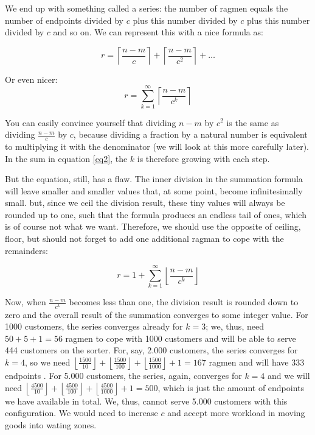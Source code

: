 \documentclass{scrreprt}
\begin{document}
We end up with something called a series:
the number of ragmen equals
the number of endpoints divided by $c$ 
plus this number divided by $c$ 
plus this number divided by $c$ 
and so on. We can represent this with a nice formula as:

\begin{equation}
r = \left\lceil\frac{n - m}{c}\right\rceil 
  + \left\lceil\frac{n - m}{c^2}\right\rceil 
  + \dots
\end{equation}

Or even nicer:
\begin{equation}\label{eq2}
r = \sum_{k=1}^{\infty}\left\lceil\frac{n - m}{c^k}\right\rceil 
\end{equation}

You can easily convince yourself
that dividing $n - m$ by $c^2$ is the same
as dividing $\frac{n - m}{c}$ by $c$,
because dividing a fraction by a natural number
is equivalent to multiplying it with the denominator
(we will look at this more carefully later).
In the sum in equation \ref{eq2},
the $k$ is therefore growing with each step.

But the equation, still, has a flaw.
The inner division in the summation formula
will leave smaller and smaller values
that, at some point, become infinitesimally small.
but, since we ceil the division result,
these tiny values will always be rounded up
to one, such that the formula produces
an endless tail of ones,
which is of course not what we want.
Therefore, we should use the opposite of ceiling,
floor, but should not forget to add one additional
ragman to cope with the remainders:

\begin{equation}\label{eq3}
r = 1 + \sum_{k=1}^{\infty}{\left\lfloor\frac{n - m}{c^k}\right\rfloor}
\end{equation}

Now, when $\frac{n - m}{c^k}$ becomes less than one,
the division result is rounded down to zero
and the overall result of the summation
converges to some integer value.
For \num{1000} customers, the series converges already
for $k = 3$; we, thus, need $50 + 5 + 1 = 56$ ragmen to cope
with \num{1000} customers and
will be able to serve 444 customers on the sorter.
For, say, \num{2,000} customers, the series converges
for $k = 4$, so we need 
$\left\lfloor\frac{1500}{10}\right\rfloor   + 
 \left\lfloor\frac{1500}{100}\right\rfloor  + 
 \left\lfloor\frac{1500}{1000}\right\rfloor + 1 
 = 167$
ragmen and will have 333 endpoints .
For \num{5,000} customers, the series, again, converges
for $k = 4$ and we will need
$\left\lfloor\frac{4500}{10}\right\rfloor   + 
 \left\lfloor\frac{4500}{100}\right\rfloor  + 
 \left\lfloor\frac{4500}{1000}\right\rfloor + 1 
 = 500$,
which is just the amount of endpoints we have available in total.
We, thus, cannot serve \num{5,000} customers with 
this configuration. We would need to increase $c$
and accept more workload in moving
goods into wating zones.
\end{document}
